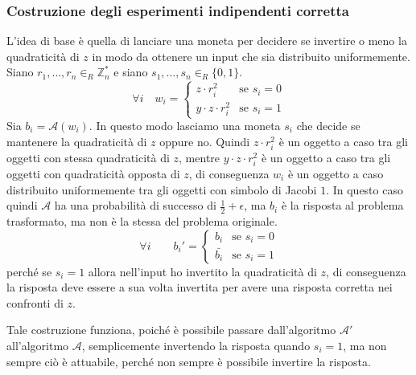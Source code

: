 \subsubsection{Costruzione degli esperimenti indipendenti corretta}
L'idea di base è quella di lanciare una moneta per decidere se invertire o meno la 
quadraticità di $z$ in modo da ottenere un input che sia distribuito uniformemente.
Siano $r_1, \dots, r_n \in_R \mathbb{Z}_n^*$ e siano $s_1, \dots, s_n \in_R \{0,1\}$.
\[
  \forall i \quad w_i = 
  \begin{cases}
    z \cdot r_i^2 & \text{se } s_i = 0 \\
    y \cdot z \cdot r_i^2 & \text{se } s_i = 1
  \end{cases}
\]
Sia $b_i = \mathcal{A}(w_i)$. In questo modo lasciamo una moneta $s_i$ che decide se mantenere 
la quadraticità di $z$ oppure no. Quindi $z \cdot r_i^2$ è un oggetto a caso tra gli oggetti con stessa 
quadraticità di $z$, mentre $y \cdot z \cdot r_i^2$ è un oggetto a caso tra gli oggetti con quadraticità 
opposta di $z$, di conseguenza $w_i$ è un oggetto a caso distribuito
uniformemente tra gli oggetti con simbolo di Jacobi $1$.
In questo caso quindi $\mathcal{A}$ ha una probabilità di successo di $\frac{1}{2} + \epsilon$, ma 
$b_i$ è la risposta al problema trasformato, ma non è la stessa del problema originale.
\[
  \forall i \qquad b_i' = 
  \begin{cases}
    b_i & \text{se } s_i = 0 \\
    \bar{b_i} & \text{se } s_i = 1
  \end{cases}
\]
perché se $s_i = 1$ allora nell'input ho invertito la quadraticità di $z$, di conseguenza la risposta deve essere 
a sua volta invertita per avere una risposta corretta nei confronti di $z$.

Tale costruzione funziona, poiché è possibile passare dall'algoritmo $\mathcal{A}'$
all'algoritmo $\mathcal{A}$, semplicemente invertendo la risposta quando $s_i = 1$, ma non
sempre ciò è attuabile, perché non sempre è possibile invertire la risposta.

